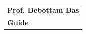\vspace*{-1.0cm} %
\hfill
\begin{minipage}[t]{0.4\linewidth}
	\begin{tabular}{@{}l@{}}
		\textbf{Prof. Debottam Das} \\
		\textbf{Guide} %
	\end{tabular}
\end{minipage}



\newpage


